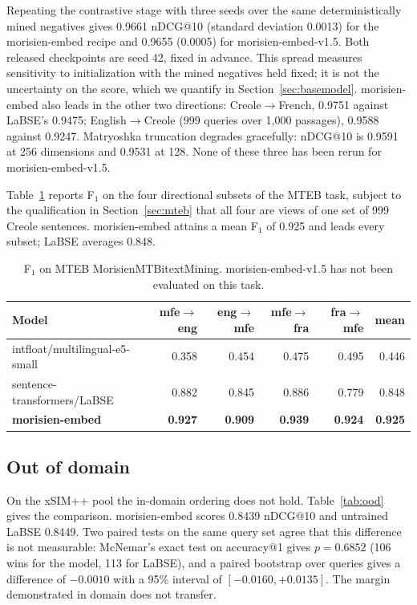 \documentclass[11pt]{article}
\begin{document}
Repeating the contrastive stage with three seeds over the same deterministically mined negatives
gives 0.9661 nDCG@10 (standard deviation 0.0013) for the morisien-embed recipe and 0.9655 (0.0005)
for morisien-embed-v1.5. Both released checkpoints are seed 42, fixed in advance. This spread
measures sensitivity to initialization with the mined negatives held fixed; it is not the uncertainty
on the score, which we quantify in Section~\ref{sec:basemodel}. morisien-embed also leads in the
other two directions: Creole$\rightarrow$French, 0.9751 against LaBSE's 0.9475;
English$\rightarrow$Creole (999 queries over 1{,}000 passages), 0.9588 against 0.9247. Matryoshka
truncation degrades gracefully: nDCG@10 is 0.9591 at 256 dimensions and 0.9531 at 128. None of these
three has been rerun for morisien-embed-v1.5.

Table~\ref{tab:mteb} reports F$_1$ on the four directional subsets of the MTEB task, subject to the
qualification in Section~\ref{sec:mteb} that all four are views of one set of 999 Creole sentences.
morisien-embed attains a mean F$_1$ of 0.925 and leads every subset; LaBSE averages 0.848.

\begin{table}[h]
\centering
\small
\begin{tabular}{lrrrrr}
\toprule
Model & mfe$\to$eng & eng$\to$mfe & mfe$\to$fra & fra$\to$mfe & mean \\
\midrule
intfloat/multilingual-e5-small & 0.358 & 0.454 & 0.475 & 0.495 & 0.446 \\
sentence-transformers/LaBSE & 0.882 & 0.845 & 0.886 & 0.779 & 0.848 \\
\textbf{morisien-embed} & \textbf{0.927} & \textbf{0.909} & \textbf{0.939} & \textbf{0.924} & \textbf{0.925} \\
\bottomrule
\end{tabular}
\caption{F$_1$ on MTEB MorisienMTBitextMining. morisien-embed-v1.5 has not been evaluated on this
task.}
\label{tab:mteb}
\end{table}

\subsection{Out of domain}
\label{sec:ood}

On the xSIM++ pool the in-domain ordering does not hold. Table~\ref{tab:ood} gives the comparison.
morisien-embed scores 0.8439 nDCG@10 and untrained LaBSE 0.8449. Two paired tests on the same query
set agree that this difference is not measurable: McNemar's exact test on accuracy@1 gives
$p = 0.6852$ (106 wins for the model, 113 for LaBSE), and a paired bootstrap over queries gives a
difference of $-0.0010$ with a 95\% interval of $[-0.0160, +0.0135]$. The margin demonstrated in
domain does not transfer.
\end{document}
